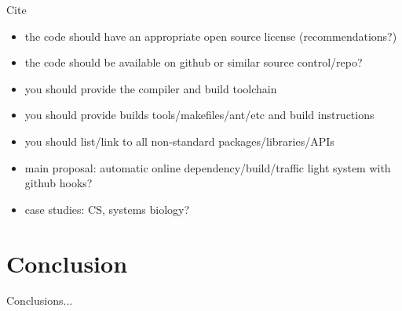 \documentclass[conference]{IEEEtran}
\begin{document}
Cite~\cite{collberg-et-al:2014}

\begin{itemize}
\item the code should have an appropriate open source license (recommendations?)
\item the code should be available on github or similar source control/repo?
\item you should provide the compiler and build toolchain
\item you should provide builds tools/makefiles/ant/etc and build instructions
\item you should list/link to all non-standard packages/libraries/APIs
\item main proposal: automatic online dependency/build/traffic light system with github hooks?
\item case studies: CS, systems biology?
\end{itemize}

\section{Conclusion}
Conclusions...



\end{document}
